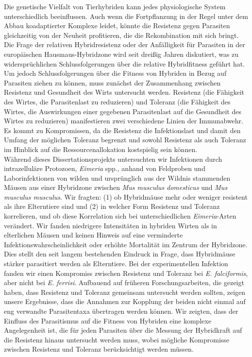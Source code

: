 Die genetische Vielfalt von Tierhybriden kann jedes physiologische System unterschiedlich beeinflussen. Auch wenn die Fortpflanzung in der Regel unter dem Abbau koadaptierter Komplexe leidet, könnte die Resistenz gegen Parasiten gleichzeitig von der Neuheit profitieren, die die Rekombination mit sich bringt. Die Frage der relativen Hybridresistenz oder der Anfälligkeit für Parasiten in der europäischen Hausmaus-Hybridzone wird seit dreißig Jahren diskutiert, was zu widersprüchlichen Schlussfolgerungen über die relative Hybridfitness geführt hat. Um jedoch Schlussfolgerungen über die Fitness von Hybriden in Bezug auf Parasiten ziehen zu können, muss zunächst der Zusammenhang zwischen Resistenz und Gesundheit des Wirts untersucht werden. Resistenz (die Fähigkeit des Wirtes, die Parasitenlast zu reduzieren) und Toleranz (die Fähigkeit des Wirtes, die Auswirkungen einer gegebenen Parasitenlast auf die Gesundheit des Wirtes zu reduzieren) manifestieren zwei verschiedene Linien der Immunabwehr. Es kommt zu Kompromissen, da die Resistenz die Infektionslast und damit den Umfang der möglichen Toleranz begrenzt und sowohl Resistenz als auch Toleranz im Hinblick auf die Ressourcenallokation kostspielig sein können. \\
Während dieses Dissertationsprojekts untersuchten wir Infektionen durch intrazelluläre Protozoen, \textit{Eimeria} spp., anhand von Feldproben und Laborinfektionen von wilden und ursprünglich aus der Wildnis stammenden Mäusen aus einer Hybridzone zwischen \textit{Mus musculus domesticus} und \textit{Mus musculus musculus}. Wir fragten: (1) ob Hybridmäuse mehr oder weniger resistent als ihre Elterntiere sind und (2) in welcher Form Resistenz und Toleranz korrelieren, und ob diese Korrelation sich bei unterschiedlichen \textit{Eimeria}-Arten verändert. Wir fanden niedrigere Intensitäten in hybriden Wirten als in elterlichen Mäusen und keinen Hinweis auf eine verminderte Infektionswahrscheinlichkeit oder erhöhte Mortalität im Zentrum der Hybridzone. Dies stellt den seit langem bestehenden Eindruck in Frage, dass Hybridmäuse stärker parasitiert werden als Elterntiere. Bei der experimentellen Infektion fanden wir einen Kompromiss zwischen Resistenz und Toleranz bei \textit{E. falciformis}, aber nicht bei \textit{E. ferrisi}. Aufbauend auf früheren Forschungsarbeiten, die gezeigt haben, dass Resistenz und Toleranz gemeinsam untersucht werden sollten, zeigen unsere Ergebnisse, dass die Annahmen zur Kopplung der beiden nicht einmal auf eng verwandte Parasitentaxa übertragen werden können. Wir zeigten, dass der Einfluss des Parasitismus auf die Fitness von Hybriden eine komplexe Angelegenheit ist, die für jeden Parasiten über die Messung der Hybridkraft auf die Resistenz hinaus untersucht werden muss, wobei mögliche Kompromisse zwischen Resistenz und Toleranz berücksichtigt werden müssen.
